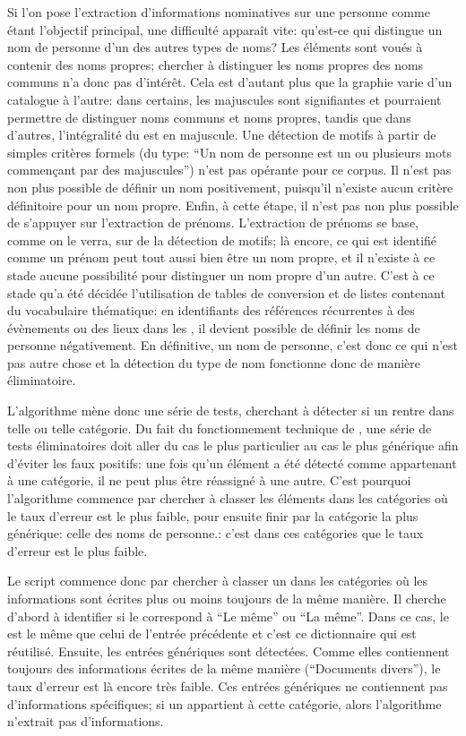 Si l'on pose l'extraction d'informations nominatives sur une personne comme étant l'objectif principal, une difficulté apparaît vite: qu'est-ce qui distingue un nom de personne d'un des autres types de noms? Les éléments \tname{} sont voués à contenir des noms propres; chercher à distinguer les noms propres des noms communs n'a donc pas d'intérêt. Cela est d'autant plus que la graphie varie d'un catalogue à l'autre: dans certains, les majuscules sont signifiantes et pourraient permettre de distinguer noms communs et noms propres, tandis que dans d'autres, l'intégralité du \tname{} est en majuscule. Une détection de motifs à partir de simples critères formels (du type: \enquote{Un nom de personne est un ou plusieurs mots commençant par des majuscules}) n'est pas opérante pour ce corpus. Il n'est pas non plus possible de définir un nom positivement, puisqu'il n'existe aucun critère définitoire pour un nom propre. Enfin, à cette étape, il n'est pas non plus possible de s'appuyer sur l'extraction de prénoms. L'extraction de prénoms se base, comme on le verra, sur de la détection de motifs; là encore, ce qui est identifié comme un prénom peut tout aussi bien être un nom propre, et il n'existe à ce stade aucune possibilité pour distinguer un nom propre d'un autre. C'est à ce stade qu'a été décidée l'utilisation de tables de conversion et de listes contenant du vocabulaire thématique: en identifiants des références récurrentes à des évènements ou des lieux dans les \tname{}, il devient possible de définir les noms de personne négativement. En définitive, un nom de personne, c'est donc ce qui n'est pas autre chose et la détection du type de nom fonctionne donc de manière éliminatoire.

L'algorithme mène donc une série de tests, cherchant à détecter si un \tname{} rentre dans telle ou telle catégorie. Du fait du fonctionnement technique de \py{}, une série de tests éliminatoires doit aller du cas le plus particulier au cas le plus générique afin d'éviter les faux positifs: une fois qu'un élément a été détecté comme appartenant à une catégorie, il ne peut plus être réassigné à une autre. C'est pourquoi l'algorithme commence par chercher à classer les éléments dans les catégories où le taux d'erreur est le plus faible, pour ensuite finir par la catégorie la plus générique: celle des noms de personne.: c'est dans ces catégories que le taux d'erreur est le plus faible. 

Le script commence donc par chercher à classer un \tname{} dans les catégories où les informations sont écrites plus ou moins toujours de la même manière. Il cherche d'abord à identifier si le \tname{} correspond à \enquote{Le même} ou \enquote{La même}. Dans ce cas, le \tname{} est le même que celui de l'entrée précédente et c'est ce \gls{dictionnaire} qui est réutilisé. Ensuite, les entrées génériques sont détectées. Comme elles contiennent toujours des informations écrites de la même manière (\enquote{Documents divers}), le taux d'erreur est là encore très faible. Ces entrées génériques ne contiennent pas d'informations spécifiques; si un \tname{} appartient à cette catégorie, alors l'algorithme n'extrait pas d'informations. 

